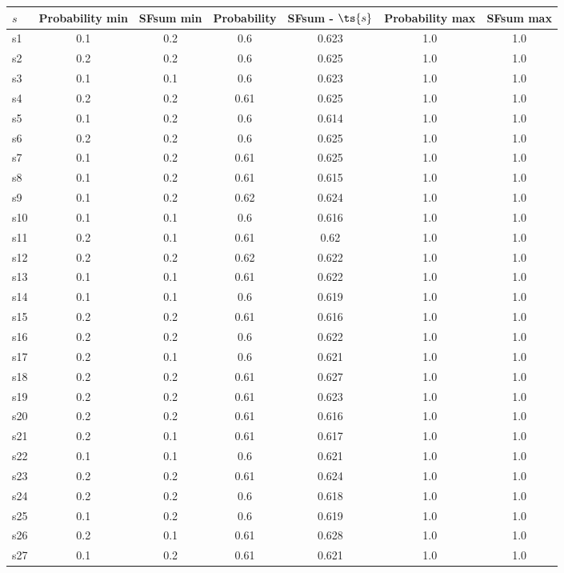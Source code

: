 \documentclass{article}
\begin{document}
\noindent\begin{tabular}{|l|c|c|c|c|c|c|}
\hline
$s$& Probability min & SFsum min & Probability & SFsum - $\ts{s}$ & Probability max & SFsum max\\
\hline
s1 &0.1 & 0.2 & 0.6 & 0.623 & 1.0 & 1.0\\
\hline
s2 &0.2 & 0.2 & 0.6 & 0.625 & 1.0 & 1.0\\
\hline
s3 &0.1 & 0.1 & 0.6 & 0.623 & 1.0 & 1.0\\
\hline
s4 &0.2 & 0.2 & 0.61 & 0.625 & 1.0 & 1.0\\
\hline
s5 &0.1 & 0.2 & 0.6 & 0.614 & 1.0 & 1.0\\
\hline
s6 &0.2 & 0.2 & 0.6 & 0.625 & 1.0 & 1.0\\
\hline
s7 &0.1 & 0.2 & 0.61 & 0.625 & 1.0 & 1.0\\
\hline
s8 &0.1 & 0.2 & 0.61 & 0.615 & 1.0 & 1.0\\
\hline
s9 &0.1 & 0.2 & 0.62 & 0.624 & 1.0 & 1.0\\
\hline
s10 &0.1 & 0.1 & 0.6 & 0.616 & 1.0 & 1.0\\
\hline
s11 &0.2 & 0.1 & 0.61 & 0.62 & 1.0 & 1.0\\
\hline
s12 &0.2 & 0.2 & 0.62 & 0.622 & 1.0 & 1.0\\
\hline
s13 &0.1 & 0.1 & 0.61 & 0.622 & 1.0 & 1.0\\
\hline
s14 &0.1 & 0.1 & 0.6 & 0.619 & 1.0 & 1.0\\
\hline
s15 &0.2 & 0.2 & 0.61 & 0.616 & 1.0 & 1.0\\
\hline
s16 &0.2 & 0.2 & 0.6 & 0.622 & 1.0 & 1.0\\
\hline
s17 &0.2 & 0.1 & 0.6 & 0.621 & 1.0 & 1.0\\
\hline
s18 &0.2 & 0.2 & 0.61 & 0.627 & 1.0 & 1.0\\
\hline
s19 &0.2 & 0.2 & 0.61 & 0.623 & 1.0 & 1.0\\
\hline
s20 &0.2 & 0.2 & 0.61 & 0.616 & 1.0 & 1.0\\
\hline
s21 &0.2 & 0.1 & 0.61 & 0.617 & 1.0 & 1.0\\
\hline
s22 &0.1 & 0.1 & 0.6 & 0.621 & 1.0 & 1.0\\
\hline
s23 &0.2 & 0.2 & 0.61 & 0.624 & 1.0 & 1.0\\
\hline
s24 &0.2 & 0.2 & 0.6 & 0.618 & 1.0 & 1.0\\
\hline
s25 &0.1 & 0.2 & 0.6 & 0.619 & 1.0 & 1.0\\
\hline
s26 &0.2 & 0.1 & 0.61 & 0.628 & 1.0 & 1.0\\
\hline
s27 &0.1 & 0.2 & 0.61 & 0.621 & 1.0 & 1.0\\

\end{tabular}
\end{document}
